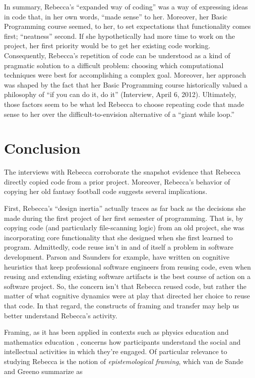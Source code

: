 In summary, Rebecca's ``expanded way of coding'' was a way of expressing ideas in code that, in her own words, ``made sense'' to her. Moreover, her Basic Programming course seemed, to her, to set expectations that functionality comes first; ``neatness'' second. If she hypothetically had more time to work on the project, her first priority would be to get her existing code working. Consequently, Rebecca's repetition of code can be understood as a kind of pragmatic solution to a difficult problem: choosing which computational techniques were best for accomplishing a complex goal. Moreover, her approach was shaped by the fact that her Basic Programming course historically valued a philosophy of ``if you can do it, do it'' (Interview, April 6, 2012). Ultimately, those factors seem to be what led Rebecca to choose repeating code that made sense to her over the difficult-to-envision alternative of a ``giant while loop.''

\section{Conclusion}

The interviews with Rebecca corroborate the snapshot evidence that
Rebecca directly copied code from a prior project. Moreover, Rebecca's
behavior of copying her old fantasy football code suggests several
implications.

First, Rebecca's ``design
inertia'' actually traces as far back as the decisions she made during
the first project of her first semester of programming. That is, by
copying code (and particularly file-scanning logic) from an old project,
she was incorporating core functionality that she designed when she
first learned to program. Admittedly, code reuse isn't in and of itself
a problem in software development. \cite{parsons_cognitive_2004} Parson and Saunders for
example, have written on cognitive heuristics that keep professional
software engineers from reusing code, even when reusing and extending
existing software artifacts is the best course of action on a software
project. So, the concern isn't that Rebecca reused code, but rather the
matter of what cognitive dynamics were at play that directed her choice
to reuse that code. In that regard, the constructs of framing and
transfer may help us better understand Rebecca's activity.

Framing, as it has been applied in contexts such as physics education
\cite{elby_epistemological_2010,hammer_resources_2005,scherr_student_2009} and
mathematics education \cite{vandesande_achieving_2012}, concerns how
participants understand the social and intellectual activities in which
they're engaged. Of particular relevance to studying Rebecca is the
notion of \emph{epistemological framing}, which van de Sande and Greeno
summarize as

